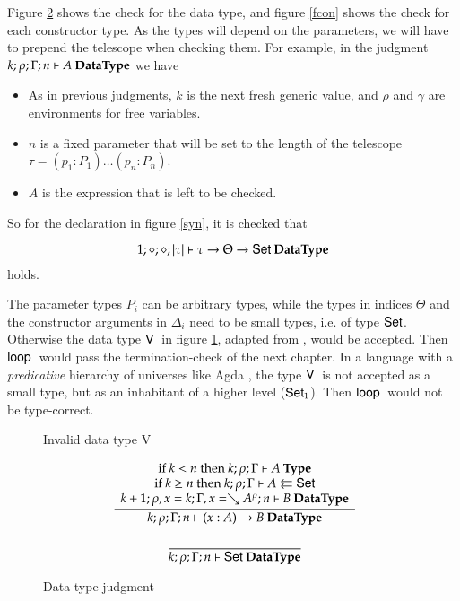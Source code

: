 Figure \ref{fdata} shows the check for the data type, and figure \ref{fcon} shows the check for each constructor type.
As the types will depend on the parameters, we will have to prepend the telescope when checking them.
For example, in the judgment $k;\rho;\Gamma;n\vdash A\:\mathbf{DataType}$ we have
\begin{itemize}
\item
As in previous judgments, $k$ is the next fresh generic value, and $\rho$ and $\gamma$ are environments for free variables.
\item
$n$ is a fixed parameter that will be set to the length of the telescope $\tau = ( p_1 : P_1) \ldots ( p_n : P_n)$. 
\item
$A$ is the expression that is left to be checked.
\end{itemize}
So for the declaration in figure \ref{syn}, it is checked that 

\[1;\diamond;\diamond;|\tau|\vdash\tau \rightarrow \Theta \rightarrow \mathsf{Set}\:\mathbf{DataType}\] holds.

The parameter types $P_i$ can be arbitrary types, while the types in indices $\Theta$  and the constructor arguments in $\Delta_i$  need to be small types, i.e. of type $\mathsf{Set}$. 
Otherwise the data type $\mathsf{V}\:$ in figure \ref{fv}, adapted from \cite{coquand92pattern}, would be accepted.
Then $\mathsf{loop}\:$ would pass the termination-check of the next chapter. In a language with a \emph{predicative} hierarchy of universes like Agda \cite{norell:thesis}, the type $\mathsf{V}\:$ is not accepted as a small type, but as an inhabitant of a higher level ($\mathsf{Set}_1$). Then $\mathsf{loop}\:$ would not be type-correct.



\begin{figure}[htp]
\caption{Invalid data type V}
\label{fv}
\end{figure}


\begin{figure}[htp]
\begin{gather*}
\ \dfrac{\begin{array}[b]{c}\mbox {if } k < n \mbox{ then } k;\rho;\Gamma\vdash A\:\mathbf{Type}\\\mbox {if } k \geq n \mbox { then } k;\rho;\Gamma\vdash A\leftleftarrows\mathsf{Set}\\k+1;\rho,x=k;\Gamma,x=\searrow A^{\rho};n\vdash B\:\mathbf{DataType}\end{array}}{k;\rho;\Gamma;n\vdash( x : A ) \rightarrow{B}\:\mathbf{DataType}}
\\[2ex]
\ \dfrac{}{k;\rho;\Gamma;n\vdash\mathsf{Set}\:\mathbf{DataType}}
\end{gather*}
\caption{Data-type judgment}
\label{fdata}
\end{figure}

